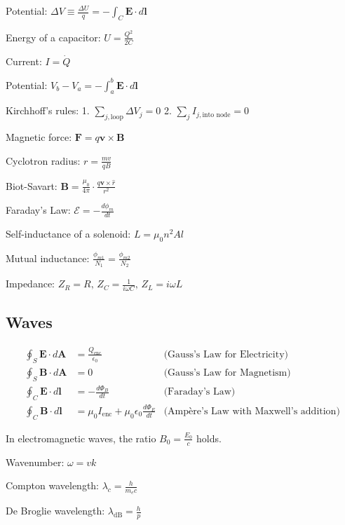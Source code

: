 \documentclass[12pt,a4paper]{article}
\begin{document}
	Potential: \( \Delta V \equiv \frac{\Delta U}{q} = - \int_{C} \mathbf{E} \cdot d\mathbf{l} \)
	
	Energy of a capacitor: \( U = \frac{Q^2}{2C} \)
	
	Current: \( I = \dot{Q} \)
	
	Potential: \( V_b - V_a = -\int_{a}^{b} \mathbf{E} \cdot d\mathbf{l} \)
	
	Kirchhoff's rules:
	1. \( \sum_{j, \text{loop}} \Delta V_j = 0 \)
	2. \( \sum_{j} I_{j, \text{into node}} = 0 \)
	
	Magnetic force: \( \mathbf{F} = q\mathbf{v} \times \mathbf{B} \)
	
	Cyclotron radius: \( r = \frac{mv}{qB} \)
	
	Biot-Savart: \( \mathbf{B} = \frac{\mu_0}{4 \pi} \cdot \frac{q \mathbf{v} \times \hat{r}}{r^2} \)
	
	Faraday's Law: \( \mathcal{E} = -\frac{d \phi_m}{dt} \)
	
	Self-inductance of a solenoid: \( L = \mu_0 n^2 A l \)
	
	Mutual inductance: \( \frac{\phi_{m1}}{N_1} = \frac{\phi_{m2}}{N_2} \)
	
	Impedance: \( Z_R = R, \, Z_C = \frac{1}{i \omega C}, \, Z_L = i \omega L \)
	
	\subsection*{Waves}
	\begin{align}
		\oint_{S} \mathbf{E} \cdot d\mathbf{A} &= \frac{Q_{\text{enc}}}{\epsilon_0} &\text{(Gauss's Law for Electricity)} \\
		\oint_{S} \mathbf{B} \cdot d\mathbf{A} &= 0 &\text{(Gauss's Law for Magnetism)} \\
		\oint_{C} \mathbf{E} \cdot d\mathbf{l} &= -\frac{d\Phi_{B}}{dt} &\text{(Faraday's Law)} \\
		\oint_{C} \mathbf{B} \cdot d\mathbf{l} &= \mu_0 I_{\text{enc}} + \mu_0 \epsilon_0 \frac{d\Phi_{E}}{dt} &\text{(Ampère's Law with Maxwell's addition)}
	\end{align}
	
	In electromagnetic waves, the ratio \( B_0 = \frac{E_0}{c} \) holds.
	
	Wavenumber: \( \omega = vk \)
	
	Compton wavelength: \( \lambda_c = \frac{h}{m_e c} \)
	
	De Broglie wavelength: \( \lambda_{\text{dB}} = \frac{h}{p} \)
	
\end{document}
